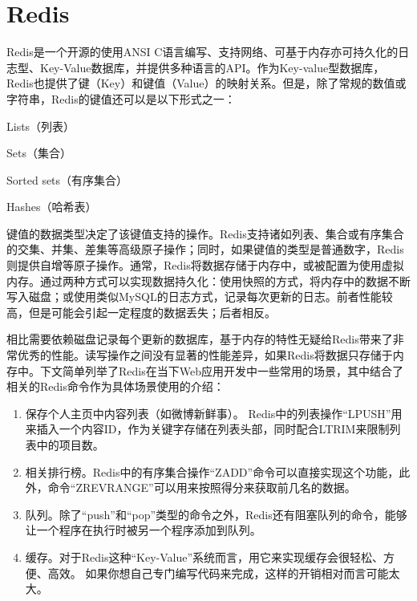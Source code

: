 \documentclass{zjutthesis}
\begin{document}
\section{Redis}
Redis是一个开源的使用ANSI C语言编写、支持网络、可基于内存亦可持久化的日志型、Key-Value数据库，并提供多种语言的API。作为Key-value型数据库，Redis也提供了键（Key）和键值（Value）的映射关系。但是，除了常规的数值或字符串，Redis的键值还可以是以下形式之一：

Lists（列表）

Sets（集合）

Sorted sets（有序集合）

Hashes（哈希表）

键值的数据类型决定了该键值支持的操作。Redis支持诸如列表、集合或有序集合的交集、并集、差集等高级原子操作；同时，如果键值的类型是普通数字，Redis则提供自增等原子操作。通常，Redis将数据存储于内存中，或被配置为使用虚拟内存。通过两种方式可以实现数据持久化：使用快照的方式，将内存中的数据不断写入磁盘；或使用类似MySQL的日志方式，记录每次更新的日志。前者性能较高，但是可能会引起一定程度的数据丢失；后者相反。

相比需要依赖磁盘记录每个更新的数据库，基于内存的特性无疑给Redis带来了非常优秀的性能。读写操作之间没有显著的性能差异，如果Redis将数据只存储于内存中。下文简单列举了Redis在当下Web应用开发中一些常用的场景，其中结合了相关的Redis命令作为具体场景使用的介绍：

\begin{enumerate}[label=（\arabic*）]
\item{保存个人主页中内容列表（如微博新鲜事）。
Redis中的列表操作“LPUSH”用来插入一个内容ID，作为关键字存储在列表头部，同时配合LTRIM来限制列表中的项目数。}

\item{相关排行榜。Redis中的有序集合操作“ZADD”命令可以直接实现这个功能，此外，命令“ZREVRANGE”可以用来按照得分来获取前几名的数据。}

\item{队列。除了“push”和“pop”类型的命令之外，Redis还有阻塞队列的命令，能够让一个程序在执行时被另一个程序添加到队列。}

\item{缓存。对于Redis这种“Key-Value”系统而言，用它来实现缓存会很轻松、方便、高效。
如果你想自己专门编写代码来完成，这样的开销相对而言可能太大。}
\end{enumerate}
\end{document}
